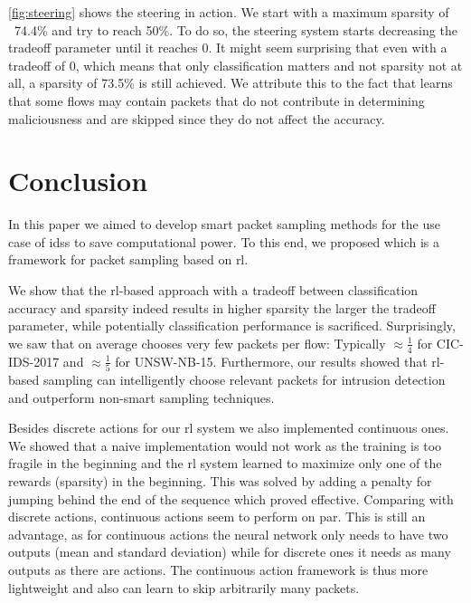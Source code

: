 \documentclass[conference]{IEEEtran}
\begin{document}
\autoref{fig:steering} shows the steering in action. We start with a maximum sparsity of ~74.4\% and try to reach 50\%. To do so, the steering system starts decreasing the tradeoff parameter until it reaches 0. It might seem surprising that even with a tradeoff of 0, which means that only classification matters and not sparsity not at all, a sparsity of 73.5\% is still achieved. We attribute this to the fact that \ours{} learns that some flows may contain packets that do not contribute in determining maliciousness and are skipped since they do not affect the accuracy. %


\section{Conclusion}
\label{sec:conclusion}
In this paper we aimed to develop smart packet sampling methods for the use case of \glspl{ids} to save computational power. To this end, we proposed \ours{} which is a framework for packet sampling based on \gls{rl}.

We show that the \gls{rl}-based approach with a tradeoff between classification accuracy and sparsity indeed results in higher sparsity the larger the tradeoff parameter, while potentially classification performance is sacrificed. Surprisingly, we saw that \ours{} on average chooses very few packets per flow: Typically $\approx \frac{1}{4}$ for CIC-IDS-2017 and $\approx \frac{1}{5}$ for UNSW-NB-15. Furthermore, our results showed that \gls{rl}-based sampling can intelligently choose relevant packets for intrusion detection and outperform non-smart sampling techniques.

Besides discrete actions for our \gls{rl} system we also implemented continuous ones. We showed that a naive implementation would not work as the training is too fragile in the beginning and the \gls{rl} system learned to maximize only one of the rewards (sparsity) in the beginning. This was solved by adding a penalty for jumping behind the end of the sequence which proved effective. Comparing with discrete actions, continuous actions seem to perform on par. This is still an advantage, as for continuous actions the neural network only needs to have two outputs (mean and standard deviation) while for discrete ones it needs as many outputs as there are actions. The continuous action framework is thus more lightweight and also can learn to skip arbitrarily many packets.
\end{document}
